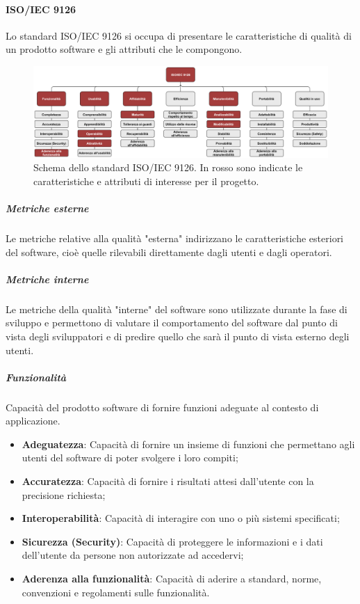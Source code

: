 \paragraph*{ISO/IEC 9126}
Lo standard ISO/IEC 9126 si occupa di presentare le caratteristiche di qualità di un prodotto software e gli attributi che le compongono.

\begin{figure}[h]
    \centering
    \includegraphics[scale=0.53]{Immagini/IsoIec9126.png}
    \caption{Schema dello standard ISO/IEC 9126. In rosso sono indicate le caratteristiche e attributi di interesse per il progetto.}
\end{figure}

\subparagraph*{Metriche esterne}
Le metriche relative alla qualità "esterna" indirizzano le caratteristiche esteriori del software, cioè quelle rilevabili direttamente dagli utenti e dagli operatori.

\subparagraph*{Metriche interne}
Le metriche della qualità "interne" del software sono utilizzate durante la fase di sviluppo e permettono di valutare il comportamento del software dal punto di vista degli sviluppatori e di predire quello che sarà il punto di vista esterno degli utenti.

\subparagraph*{Funzionalità}
Capacità del prodotto software di fornire funzioni adeguate al contesto di applicazione.
\begin{itemize}
\item \textbf{Adeguatezza}: Capacità di fornire un insieme di funzioni che permettano agli utenti del software di poter svolgere i loro compiti;
\item \textbf{Accuratezza}: Capacità di fornire i risultati attesi dall’utente con la precisione richiesta;
\item \textbf{Interoperabilità}: Capacità di interagire con uno o più sistemi specificati;
\item \textbf{Sicurezza (Security)}: Capacità di proteggere le informazioni e i dati dell’utente da persone non autorizzate ad accedervi;
\item \textbf{Aderenza alla funzionalità}: Capacità di aderire a standard, norme, convenzioni e regolamenti sulle funzionalità.
\end{itemize}

